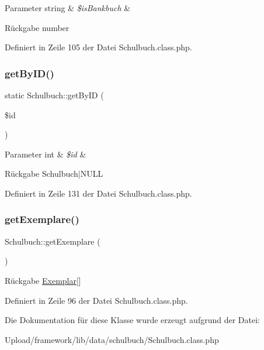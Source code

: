 \begin{DoxyParams}[1]{Parameter}
string & {\em \$is\+Bankbuch} & \\
\hline
\end{DoxyParams}
\begin{DoxyReturn}{Rückgabe}
number 
\end{DoxyReturn}


Definiert in Zeile 105 der Datei Schulbuch.\+class.\+php.

\mbox{\label{class_schulbuch_ae19c7c8301c85aab2b4f518762e45364}} 
\subsubsection{\texorpdfstring{get\+By\+I\+D()}{getByID()}}
{\footnotesize\ttfamily static Schulbuch\+::get\+By\+ID (\begin{DoxyParamCaption}\item[{}]{\$id }\end{DoxyParamCaption})\hspace{0.3cm}{\ttfamily [static]}}


\begin{DoxyParams}[1]{Parameter}
int & {\em \$id} & \\
\hline
\end{DoxyParams}
\begin{DoxyReturn}{Rückgabe}
Schulbuch$\vert$\+N\+U\+LL 
\end{DoxyReturn}


Definiert in Zeile 131 der Datei Schulbuch.\+class.\+php.

\mbox{\label{class_schulbuch_a215c174df71eb1ccec188dcfac698d23}} 
\subsubsection{\texorpdfstring{get\+Exemplare()}{getExemplare()}}
{\footnotesize\ttfamily Schulbuch\+::get\+Exemplare (\begin{DoxyParamCaption}{ }\end{DoxyParamCaption})}

\begin{DoxyReturn}{Rückgabe}
\mbox{\hyperlink{class_exemplar}{Exemplar}}\mbox{[}\mbox{]} 
\end{DoxyReturn}


Definiert in Zeile 96 der Datei Schulbuch.\+class.\+php.



Die Dokumentation für diese Klasse wurde erzeugt aufgrund der Datei\+:\begin{DoxyCompactItemize}
\item 
Upload/framework/lib/data/schulbuch/Schulbuch.\+class.\+php\end{DoxyCompactItemize}
